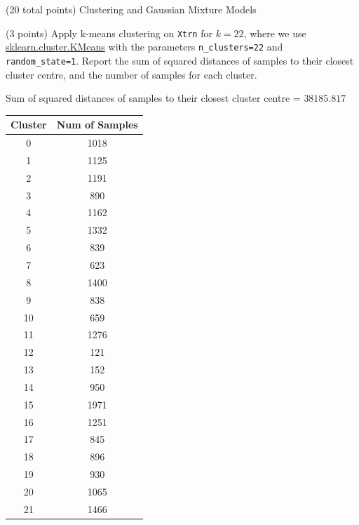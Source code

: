 \documentclass[12pt]{article}
\begin{document}
\begin{question}{(20 total points) Clustering and Gaussian Mixture Models}  


  


  \medskip
   \begin{subquestion}{(3 points)
       Apply k-means clustering on {\tt Xtrn} for $k = 22$, where we use
       \href{https://scikit-learn.org/0.19/modules/generated/sklearn.cluster.KMeans.html}{sklearn.cluster.KMeans}
       with the parameters {\tt n\_clusters=22} and {\tt random\_state=1}.
       Report the sum of squared distances of samples to their closest
       cluster centre, and the number of samples for each cluster.
     } \label{Q3.1}
   

      \begin{answerbox}{35em}
        Sum of squared distances of samples to their closest cluster centre = $38185.817$
         \begin{center}
            \begin{tabular}{|c|c|}
                \toprule
                Cluster & Num of Samples \\ \hline
                0 & 1018 \\
                1 & 1125 \\
                2 & 1191 \\
                3 & 890 \\
                4 & 1162 \\
                5 & 1332 \\
                6 & 839 \\
                7 & 623 \\
                8 & 1400 \\
                9 & 838 \\
                10 & 659 \\
                11 & 1276 \\
                12 & 121 \\
                13 & 152 \\
                14 & 950 \\
                15 & 1971 \\
                16 & 1251 \\
                17 & 845 \\
                18 & 896 \\
                19 & 930 \\
                20 & 1065 \\
                21 & 1466 \\
                \bottomrule
            \end{tabular}    
         \end{center}
         

\end{answerbox}
\end{subquestion}
\end{question}
\end{document}
